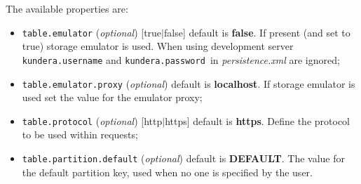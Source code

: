 \noindent The available properties are:
\begin{itemize}
\item \texttt{table.emulator} (\textit{optional}) [true$\vert$false] default is \textbf{false}. If present (and set to true) storage emulator is used. When using development server \texttt{kundera.username} and \texttt{kundera.password }in \textit{persistence.xml} are ignored;
\item \texttt{table.emulator.proxy} (\textit{optional}) default is \textbf{localhost}. If storage emulator is used set the value for the emulator proxy;
\item \texttt{table.protocol} (\textit{optional}) [http$\vert$https] default is \textbf{https}. Define the protocol to be used within requests;
\item \texttt{table.partition.default} (\textit{optional}) default is \textbf{DEFAULT}.
The value for the default partition key, used when no one is specified by the user.
\end{itemize}
